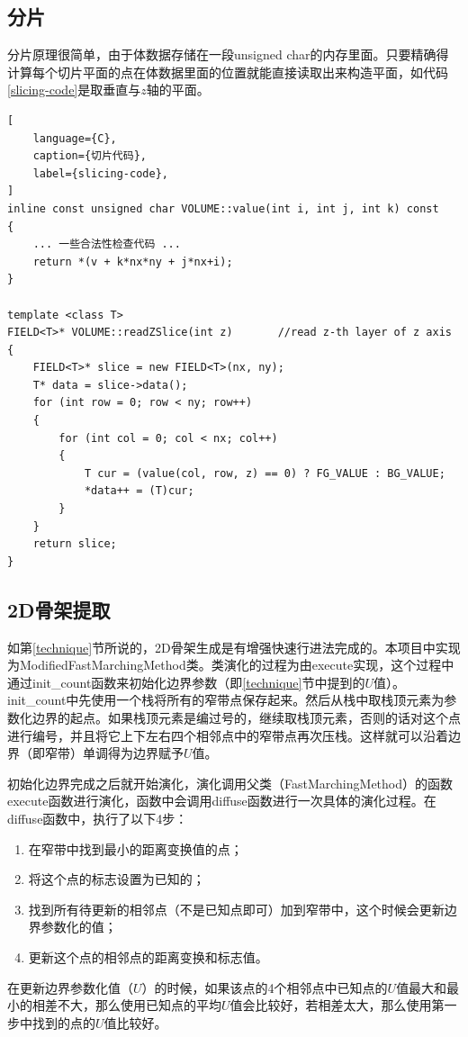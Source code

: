 \subsection{分片}
分片原理很简单，由于体数据存储在一段unsigned char的内存里面。只要精确得计算每个切片平面的点在体数据里面的位置就能直接读取出来构造平面，如代码\ref{slicing-code}是取垂直与$z$轴的平面。
\begin{lstlisting}[
    language={C},
    caption={切片代码},
    label={slicing-code},
]
inline const unsigned char VOLUME::value(int i, int j, int k) const
{
    ... 一些合法性检查代码 ... 
    return *(v + k*nx*ny + j*nx+i);
}

template <class T>
FIELD<T>* VOLUME::readZSlice(int z)       //read z-th layer of z axis
{
    FIELD<T>* slice = new FIELD<T>(nx, ny);
    T* data = slice->data();
    for (int row = 0; row < ny; row++)
    {
        for (int col = 0; col < nx; col++)
        {
            T cur = (value(col, row, z) == 0) ? FG_VALUE : BG_VALUE;
            *data++ = (T)cur;
        }
    }
    return slice;
}
\end{lstlisting}

\subsection{2D骨架提取}
如第\ref{technique}节所说的，2D骨架生成是有增强快速行进法完成的。本项目中实现为ModifiedFastMarchingMethod类。类演化的过程为由execute实现，这个过程中通过init\_count函数来初始化边界参数（即\ref{technique}节中提到的$U$值）。init\_count中先使用一个栈将所有的窄带点保存起来。然后从栈中取栈顶元素为参数化边界的起点。如果栈顶元素是编过号的，继续取栈顶元素，否则的话对这个点进行编号，并且将它上下左右四个相邻点中的窄带点再次压栈。这样就可以沿着边界（即窄带）单调得为边界赋予$U$值。

初始化边界完成之后就开始演化，演化调用父类（FastMarchingMethod）的函数execute函数进行演化，函数中会调用diffuse函数进行一次具体的演化过程。在diffuse函数中，执行了以下4步：
\begin{enumerate}
    \item 在窄带中找到最小的距离变换值的点；
    \item 将这个点的标志设置为已知的；
    \item 找到所有待更新的相邻点（不是已知点即可）加到窄带中，这个时候会更新边界参数化的值；
    \item 更新这个点的相邻点的距离变换和标志值。
\end{enumerate}
在更新边界参数化值（$U$）的时候，如果该点的4个相邻点中已知点的$U$值最大和最小的相差不大，那么使用已知点的平均$U$值会比较好，若相差太大，那么使用第一步中找到的点的$U$值比较好。

